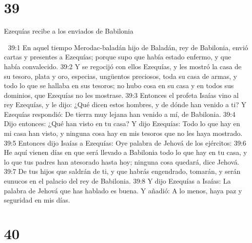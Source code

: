 \chapter{39}

Ezequías recibe a los enviados de Babilonia  


39:1 En aquel tiempo Merodac-baladán hijo de Baladán, rey de Babilonia, envió cartas y presentes a Ezequías; porque supo que había estado enfermo, y que había convalecido.  
39:2 Y se regocijó con ellos Ezequías, y les mostró la casa de su tesoro, plata y oro, especias, ungüentos preciosos, toda su casa de armas, y todo lo que se hallaba en sus tesoros; no hubo cosa en su casa y en todos sus dominios, que Ezequías no les mostrase.  
39:3 Entonces el profeta Isaías vino al rey Ezequías, y le dijo: ¿Qué dicen estos hombres, y de dónde han venido a ti? Y Ezequías respondió: De tierra muy lejana han venido a mí, de Babilonia.  
39:4 Dijo entonces: ¿Qué han visto en tu casa? Y dijo Ezequías: Todo lo que hay en mi casa han visto, y ninguna cosa hay en mis tesoros que no les haya mostrado.  
39:5 Entonces dijo Isaías a Ezequías: Oye palabra de Jehová de los ejércitos:  
39:6 He aquí vienen días en que será llevado a Babilonia todo lo que hay en tu casa, y lo que tus padres han atesorado hasta hoy; ninguna cosa quedará, dice Jehová.  
39:7 De tus hijos que saldrán de ti, y que habrás engendrado, tomarán, y serán eunucos en el palacio del rey de Babilonia. 
39:8 Y dijo Ezequías a Isaías: La palabra de Jehová que has hablado es buena. Y añadió: A lo menos, haya paz y seguridad en mis días.  

\chapter{40}

